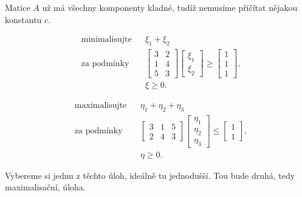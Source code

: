 Matice $A$ už má všechny komponenty kladné, tudíž nemusíme přičítat nějakou konstantu $c$.
\begin{multicols}{2}
    \[
    \begin{aligned}
        &\text{minimalisujte}&& \xi_1 + \xi_2 \\
        &\text{za podmínky}  && 
        \begin{bmatrix}
            3 & 2 \\
            1 & 4 \\
            5 & 3
        \end{bmatrix}
        \begin{bmatrix}
            \xi_1 \\ \xi_2
        \end{bmatrix} \geq 
        \begin{bmatrix}
            1 \\ 1 \\ 1
        \end{bmatrix}, \\
        &\phantom{\text{za podmínky}}&&\xi \geq 0.
    \end{aligned}
    \]

    \[
    \begin{aligned}
        &\text{maximalisujte}&& \eta_1 + \eta_2 + \eta_3 \\
        &\text{za podmínky}  && 
        \begin{bmatrix}
            3 & 1 & 5 \\
            2 & 4 & 3
        \end{bmatrix}
        \begin{bmatrix}
            \eta_1 \\ \eta_2 \\ \eta_3
        \end{bmatrix} \leq 
        \begin{bmatrix}
            1 \\ 1
        \end{bmatrix}, \\
        &\phantom{\text{za podmínky}}&&\eta \geq 0.
    \end{aligned}
    \]
\end{multicols}
Vybereme si jednu z těchto úloh, ideálně tu jednodušší. Tou bude druhá, tedy maximalisační, úloha.

